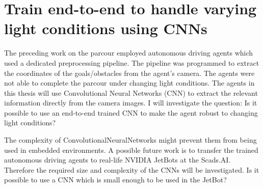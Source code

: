 \section*{Train end-to-end to handle varying light conditions using CNNs}

The preceding work on the parcour employed autonomous driving agents which used a dedicated preprocessing pipeline. The pipeline was programmed to extract the coordinates of the goals/obstacles from the agent's camera. The agents were not able to complete the parcour under changing light conditions. The agents in this thesis will use Convolutional Neural Networks (CNN) to extract the relevant information directly from the camera images. I will investigate the question: Is it possible to use an end-to-end trained CNN to make the agent robust to changing light conditions?

The complexity of ConvolutionalNeuralNetworks might prevent them from being used in embedded environments. A possible future work is to transfer the trained autonomous driving agents to real-life NVIDIA JetBots at the Scads.AI. Therefore the required size and complexity of the CNNs will be investigated. Is it possible to use a CNN which is small enough to be used in the JetBot?


